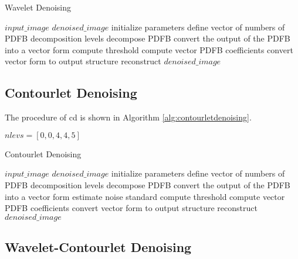 \begin{algorithm}
	\caption{Wavelet Denoising}\label{alg:waveletdenoising}
	\begin{algorithmic}[1]
		\Require $input\_image$
		\Ensure $denoised\_image$
			\State initialize parameters
			\State define vector of numbers of PDFB decomposition levels  
			\State decompose PDFB 
			\State convert the output of the PDFB into a vector form 
			\State compute threshold 
			\State compute vector PDFB coefficients 
			\State convert vector form to output structure 
			\State reconstruct $denoised\_image$ 
		\EndProcedure
	\end{algorithmic}
\end{algorithm}


\subsection{Contourlet Denoising}
The procedure of \gls{cd} is shown in Algorithm \ref{alg:contourletdenoising}.


$nlevs = [0, 0, 4, 4, 5]$

\begin{algorithm}
	\caption{Contourlet Denoising}\label{alg:contourletdenoising}
	\begin{algorithmic}[1]
		\Require $input\_image$
		\Ensure $denoised\_image$
		\State initialize parameters
		\State define vector of numbers of PDFB decomposition levels  
		\State decompose PDFB 
		\State convert the output of the PDFB into a vector form 
		\State estimate noise standard 
		\State compute threshold 
		\State compute vector PDFB coefficients  
		\State convert vector form to output structure 
		\State reconstruct $denoised\_image$ 
		\EndProcedure
	\end{algorithmic}
\end{algorithm}

\subsection{Wavelet-Contourlet Denoising}